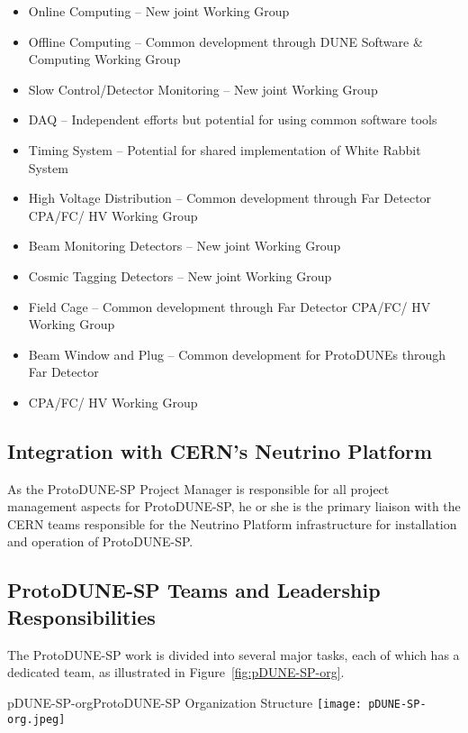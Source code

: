 \begin{itemize}
\item Online Computing -- New joint Working Group
\item Offline Computing -- Common development through DUNE Software \& Computing Working Group
\item Slow Control/Detector Monitoring -- New joint Working Group
\item DAQ -- Independent efforts but potential for using common software tools
\item Timing System -- Potential for shared implementation of White Rabbit System
\item High Voltage Distribution -- Common development through Far Detector CPA/FC/ HV Working Group
\item Beam Monitoring Detectors -- New joint Working Group
\item Cosmic Tagging Detectors -- New joint Working Group
\item Field Cage -- Common development through Far Detector CPA/FC/ HV Working Group
\item Beam Window and Plug -- Common development for ProtoDUNEs through Far Detector
\item CPA/FC/ HV Working Group
\end{itemize}

\subsection{Integration with CERN's Neutrino Platform}

As the ProtoDUNE-SP Project Manager is responsible for all project management aspects for ProtoDUNE-SP, he or she is the primary liaison with the CERN teams responsible for the Neutrino Platform infrastructure for installation and operation of ProtoDUNE-SP.

\subsection{ProtoDUNE-SP Teams and Leadership Responsibilities}

The ProtoDUNE-SP work is divided into several major tasks, each of which has a dedicated team, as illustrated in Figure~\ref{fig:pDUNE-SP-org}.

\begin{cdrfigure}{pDUNE-SP-org}{ProtoDUNE-SP Organization Structure}
  \texttt{[image: pDUNE-SP-org.jpeg]}
\end{cdrfigure}

